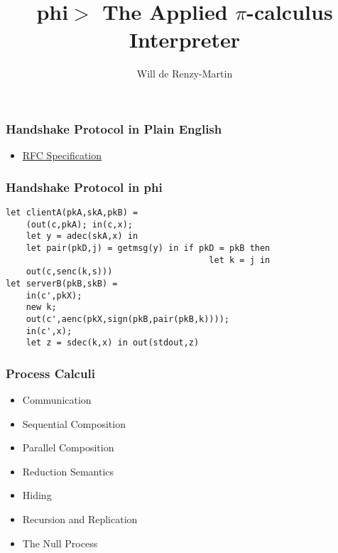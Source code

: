 \documentclass[t]{beamer}
\author{Will de Renzy-Martin}
\title{phi$>$ The Applied $\pi$-calculus Interpreter}
\begin{document}
\frame{\maketitle}

\begin{frame}
\frametitle{Handshake Protocol in Plain English}
\begin{itemize}
    \item \href{http://tools.ietf.org/html/rfc5246\#section-7.4}{RFC Specification}
\end{itemize}
\end{frame}

\begin{frame}[fragile]
\frametitle{Handshake Protocol in phi}
\begin{verbatim}
let clientA(pkA,skA,pkB) =  
    (out(c,pkA); in(c,x); 
    let y = adec(skA,x) in
    let pair(pkD,j) = getmsg(y) in if pkD = pkB then 
                                        let k = j in
    out(c,senc(k,s)))
let serverB(pkB,skB) = 
    in(c',pkX);
    new k;
    out(c',aenc(pkX,sign(pkB,pair(pkB,k))));
    in(c',x);
    let z = sdec(k,x) in out(stdout,z)
\end{verbatim}

\end{frame}

\begin{frame}
\frametitle{Process Calculi}
\begin{itemize}
        \pause
    \item Communication
        \pause
    \item Sequential Composition
        \pause
    \item Parallel Composition
        \pause
    \item Reduction Semantics
        \pause
    \item Hiding 
        \pause
    \item Recursion and Replication
        \pause
    \item The Null Process
\end{itemize}
\end{frame}
\end{document}
